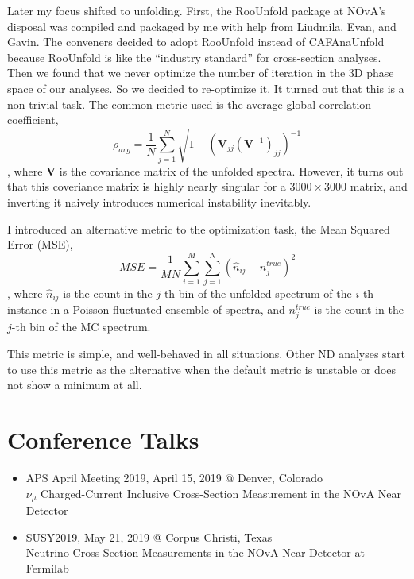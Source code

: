 \documentclass[]{report}   %
\begin{document}
Later my focus shifted to unfolding. First, the RooUnfold package at NOvA's disposal was compiled and packaged by me with help from Liudmila, Evan, and Gavin. The conveners decided to adopt RooUnfold instead of CAFAnaUnfold because RooUnfold is like the ``industry standard'' for cross-section analyses. Then we found that we never optimize the number of iteration in the 3D phase space of our analyses. So we decided to re-optimize it. It turned out that this is a non-trivial task. The common metric used is the average global correlation coefficient,
\begin{equation}
  \rho_{avg}=\frac{1}{N}\sum_{j=1}^N \sqrt{1-(\bm{V}_{jj}(\bm{V}^{-1})_{jj})^{-1}}
\end{equation}
, where $\bm{V}$ is the covariance matrix of the unfolded spectra. However, it turns out that this coveriance matrix is highly nearly singular for a $3000\times 3000$ matrix, and inverting it naively introduces numerical instability inevitably.

I introduced an alternative metric to the optimization task, the Mean Squared Error (MSE),
\begin{equation}
  MSE=\frac{1}{MN}\sum_{i=1}^M \sum_{j=1}^N (\hat{n}_{ij}-n^{true}_j)^2
\end{equation}
, where $\hat{n}_{ij}$ is the count in the $j$-th bin of the unfolded spectrum of the $i$-th instance in a Poisson-fluctuated ensemble of spectra, and $n^{true}_j$ is the count in the $j$-th bin of the MC spectrum.

This metric is simple, and well-behaved in all situations. Other ND analyses start to use this metric as the alternative when the default metric is unstable or does not show a minimum at all.

\section*{Conference Talks}
\begin{itemize}
  \item APS April Meeting 2019, April 15, 2019 @ Denver, Colorado\\
        $\nu_\mu$ Charged-Current Inclusive Cross-Section Measurement in the NOvA Near Detector
  \item SUSY2019, May 21, 2019 @ Corpus Christi, Texas\\
        Neutrino Cross-Section Measurements in the NOvA Near Detector at Fermilab
\end{itemize}
\end{document}
